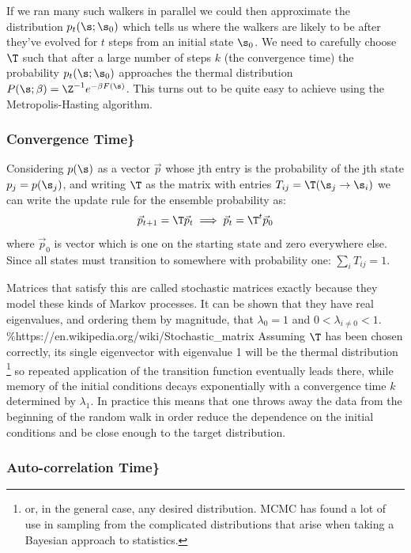If we ran many such walkers in parallel we could then approximate the distribution \(p_t(\s; \s_0)\) which tells us where the walkers are likely to be after they've evolved for \(t\) steps from an initial state \(\s_0\). We need to carefully choose \(\T\) such that after a large number of steps \(k\) (the convergence time) the probability \(p_t(\s;\s_0)\) approaches the thermal distribution \(P(\s; \beta) = \Z^{-1} e^{-\beta F(\s)}\). This turns out to be quite easy to achieve using the Metropolis-Hasting algorithm.

\hypertarget{convergence-time}{%
\subsubsection{Convergence Time\}}\label{convergence-time}}

Considering \(p(\s)\) as a vector \(\vec{p}\) whose jth entry is the probability of the jth state \(p_j = p(\s_j)\), and writing \(\T\) as the matrix with entries \(T_{ij} = \T(\s_j \rightarrow \s_i)\) we can write the update rule for the ensemble probability as: \[\vec{p}_{t+1} = \T \vec{p}_t \implies \vec{p}_{t} = \T^t \vec{p}_0\] where \(\vec{p}_0\) is vector which is one on the starting state and zero everywhere else. Since all states must transition to somewhere with probability one: \(\sum_i T_{ij} = 1\).

Matrices that satisfy this are called stochastic matrices exactly because they model these kinds of Markov processes. It can be shown that they have real eigenvalues, and ordering them by magnitude, that \(\lambda_0 = 1\) and \(0 < \lambda_{i\neq0} < 1\). \%https://en.wikipedia.org/wiki/Stochastic\_matrix Assuming \(\T\) has been chosen correctly, its single eigenvector with eigenvalue 1 will be the thermal distribution \footnote{or, in the general case, any desired distribution. MCMC has found a lot of use in sampling from the complicated distributions that arise when taking a Bayesian approach to statistics.} so repeated application of the transition function eventually leads there, while memory of the initial conditions decays exponentially with a convergence time \(k\) determined by \(\lambda_1\). In practice this means that one throws away the data from the beginning of the random walk in order reduce the dependence on the initial conditions and be close enough to the target distribution.

\hypertarget{auto-correlation-time}{%
\subsubsection{Auto-correlation Time\}}\label{auto-correlation-time}}

